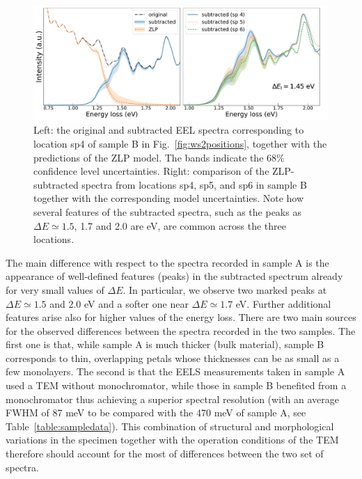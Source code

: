 \begin{figure}[t]
\begin{centering}
  \includegraphics[width=0.99\linewidth]{plots/subtractedEELS_plot_sampleB_sp4.pdf}
  \caption{Left: the original
     and subtracted EEL spectra corresponding to location sp4 of sample B in Fig.~\ref{fig:ws2positions},
     together with the predictions of the ZLP model.
     The bands indicate the 68\% confidence level uncertainties.
     Right: comparison of the ZLP-subtracted spectra from locations sp4, sp5, and sp6 in sample B
     together with the corresponding model uncertainties.
     Note how several features of the subtracted spectra, such as the peaks as $\Delta E\simeq 1.5$,
    1.7 and 2.0 are eV, are common across the three locations.
  }
\label{fig:SubtractedEELS_plot_sp4}
\end{centering}
\end{figure}

The main difference with respect to the spectra recorded in sample A is the appearance
of well-defined features (peaks) in the subtracted spectrum already for
very small values of $\Delta E$.
%
In particular, we observe two marked peaks at $\Delta E\simeq 1.5$ and 2.0 eV and a
softer one near $\Delta E \simeq 1.7$ eV.
%
Further additional features arise also for higher values of the energy loss.
%
There are two main sources for the observed differences between the spectra recorded
in the two samples.
%
The first one is that, while sample A is much thicker (bulk material), sample B corresponds
to thin, overlapping petals whose thicknesses can be as small as a few monolayers.
%
The second is that the EELS measurements taken in sample A used a TEM without monochromator,
while those in sample B benefited from a monochromator thus achieving a
superior
spectral resolution (with an average FWHM of 87 meV to be compared with the 470 meV of sample A, see
Table~\ref{table:sampledata}).
%
This combination of structural and morphological variations in the specimen together
with the operation conditions of the TEM therefore should account for the
most of differences
between the two set of spectra.

